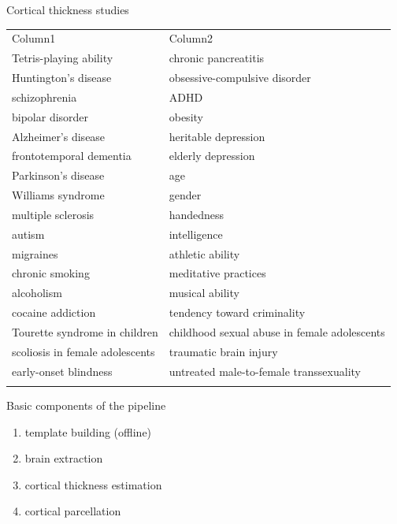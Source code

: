 \documentclass[ignorenonframetext,]{beamer}
\begin{document}
\begin{frame}{Cortical thickness studies}

\begin{longtable}[c]{@{}ll@{}}
\toprule\addlinespace
Column1 & Column2
\\\addlinespace
\midrule\endhead
Tetris-playing ability & chronic pancreatitis
\\\addlinespace
Huntington's disease & obsessive-compulsive disorder
\\\addlinespace
schizophrenia & ADHD
\\\addlinespace
bipolar disorder & obesity
\\\addlinespace
Alzheimer's disease & heritable depression
\\\addlinespace
frontotemporal dementia & elderly depression
\\\addlinespace
Parkinson's disease & age
\\\addlinespace
Williams syndrome & gender
\\\addlinespace
multiple sclerosis & handedness
\\\addlinespace
autism & intelligence
\\\addlinespace
migraines & athletic ability
\\\addlinespace
chronic smoking & meditative practices
\\\addlinespace
alcoholism & musical ability
\\\addlinespace
cocaine addiction & tendency toward criminality
\\\addlinespace
Tourette syndrome in children & childhood sexual abuse in female
adolescents
\\\addlinespace
scoliosis in female adolescents & traumatic brain injury
\\\addlinespace
early-onset blindness & untreated male-to-female transsexuality
\\\addlinespace
\bottomrule
\end{longtable}

\end{frame}

\begin{frame}{Basic components of the pipeline}

\begin{enumerate}
\def\labelenumi{\arabic{enumi}.}
\itemsep1pt\parskip0pt
\item
  template building (offline)
\item
  brain extraction
\item
  cortical thickness estimation
\item
  cortical parcellation
\end{enumerate}

\end{frame}
\end{document}
